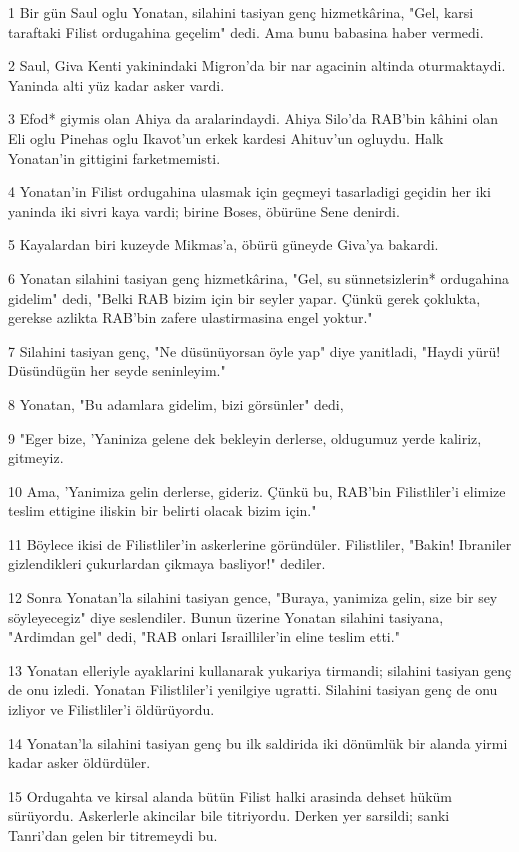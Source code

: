 \par 1 Bir gün Saul oglu Yonatan, silahini tasiyan genç hizmetkârina, "Gel, karsi taraftaki Filist ordugahina geçelim" dedi. Ama bunu babasina haber vermedi.
\par 2 Saul, Giva Kenti yakinindaki Migron'da bir nar agacinin altinda oturmaktaydi. Yaninda alti yüz kadar asker vardi.
\par 3 Efod* giymis olan Ahiya da aralarindaydi. Ahiya Silo'da RAB'bin kâhini olan Eli oglu Pinehas oglu Ikavot'un erkek kardesi Ahituv'un ogluydu. Halk Yonatan'in gittigini farketmemisti.
\par 4 Yonatan'in Filist ordugahina ulasmak için geçmeyi tasarladigi geçidin her iki yaninda iki sivri kaya vardi; birine Boses, öbürüne Sene denirdi.
\par 5 Kayalardan biri kuzeyde Mikmas'a, öbürü güneyde Giva'ya bakardi.
\par 6 Yonatan silahini tasiyan genç hizmetkârina, "Gel, su sünnetsizlerin* ordugahina gidelim" dedi, "Belki RAB bizim için bir seyler yapar. Çünkü gerek çoklukta, gerekse azlikta RAB'bin zafere ulastirmasina engel yoktur."
\par 7 Silahini tasiyan genç, "Ne düsünüyorsan öyle yap" diye yanitladi, "Haydi yürü! Düsündügün her seyde seninleyim."
\par 8 Yonatan, "Bu adamlara gidelim, bizi görsünler" dedi,
\par 9 "Eger bize, 'Yaniniza gelene dek bekleyin derlerse, oldugumuz yerde kaliriz, gitmeyiz.
\par 10 Ama, 'Yanimiza gelin derlerse, gideriz. Çünkü bu, RAB'bin Filistliler'i elimize teslim ettigine iliskin bir belirti olacak bizim için."
\par 11 Böylece ikisi de Filistliler'in askerlerine göründüler. Filistliler, "Bakin! Ibraniler gizlendikleri çukurlardan çikmaya basliyor!" dediler.
\par 12 Sonra Yonatan'la silahini tasiyan gence, "Buraya, yanimiza gelin, size bir sey söyleyecegiz" diye seslendiler. Bunun üzerine Yonatan silahini tasiyana, "Ardimdan gel" dedi, "RAB onlari Israilliler'in eline teslim etti."
\par 13 Yonatan elleriyle ayaklarini kullanarak yukariya tirmandi; silahini tasiyan genç de onu izledi. Yonatan Filistliler'i yenilgiye ugratti. Silahini tasiyan genç de onu izliyor ve Filistliler'i öldürüyordu.
\par 14 Yonatan'la silahini tasiyan genç bu ilk saldirida iki dönümlük bir alanda yirmi kadar asker öldürdüler.
\par 15 Ordugahta ve kirsal alanda bütün Filist halki arasinda dehset hüküm sürüyordu. Askerlerle akincilar bile titriyordu. Derken yer sarsildi; sanki Tanri'dan gelen bir titremeydi bu.
